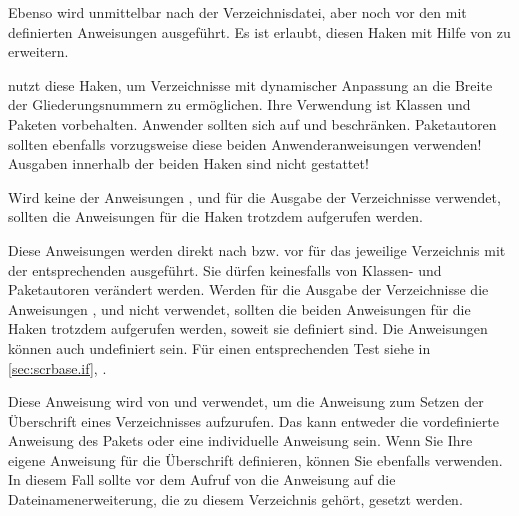 Ebenso wird  unmittelbar nach der
Verzeichnisdatei, aber noch vor den mit
 definierten Anweisungen
ausgeführt. Es ist erlaubt, diesen Haken mit Hilfe von
 zu erweitern.

\KOMAScript{} nutzt diese Haken, um Verzeichnisse mit dynamischer Anpassung an
die Breite der Gliederungsnummern zu ermöglichen. Ihre Verwendung ist Klassen
und Paketen vorbehalten. Anwender sollten sich auf
 und
 beschränken. Paketautoren sollten
ebenfalls vorzugsweise diese beiden Anwenderanweisungen verwenden!  Ausgaben
innerhalb der beiden Haken sind nicht gestattet!

Wird keine der Anweisungen
,  und
 für die Ausgabe der Verzeichnisse
verwendet, sollten die Anweisungen für die Haken trotzdem
aufgerufen werden.%
\EndIndexGroup


\begin{Declaration}
\end{Declaration}
Diese Anweisungen werden direkt nach
 bzw. vor
 für das jeweilige Verzeichnis
mit der entsprechenden 
ausgeführt. Sie  dürfen keinesfalls von Klassen- und
Paketautoren verändert werden. Werden für die Ausgabe der Verzeichnisse die
Anweisungen ,
 und 
nicht verwendet, sollten die beiden Anweisungen für die Haken
trotzdem aufgerufen werden, soweit sie definiert sind. Die Anweisungen können
auch undefiniert sein. Für einen entsprechenden Test siehe
in \autoref{sec:scrbase.if},
.%
\EndIndexGroup


\begin{Declaration}
\end{Declaration}
Diese Anweisung wird von  und
 verwendet, um die Anweisung zum Setzen
der Überschrift eines Verzeichnisses aufzurufen. Das kann entweder die
vordefinierte Anweisung des Pakets  oder eine individuelle
Anweisung sein. Wenn Sie Ihre eigene Anweisung für die Überschrift definieren,
können Sie ebenfalls  verwenden. In diesem Fall
sollte vor dem Aufruf von  die Anweisung
 auf die
Dateinamenerweiterung, die zu diesem Verzeichnis gehört, gesetzt werden.%
\EndIndexGroup


